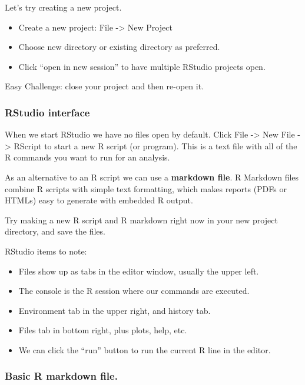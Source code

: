 \documentclass[]{article}
\providecommand{\tightlist}{%
  \setlength{\itemsep}{0pt}\setlength{\parskip}{0pt}}
\begin{document}
Let's try creating a new project.

\begin{itemize}
\tightlist
\item
  Create a new project: File -\textgreater{} New Project
\item
  Choose new directory or existing directory as preferred.
\item
  Click ``open in new session'' to have multiple RStudio projects open.
\end{itemize}

Easy Challenge: close your project and then re-open it.

\subsubsection{RStudio interface}\label{rstudio-interface}

When we start RStudio we have no files open by default. Click File
-\textgreater{} New File -\textgreater{} RScript to start a new R script
(or program). This is a text file with all of the R commands you want to
run for an analysis.

As an alternative to an R script we can use a \textbf{markdown file}. R
Markdown files combine R scripts with simple text formatting, which
makes reports (PDFs or HTMLs) easy to generate with embedded R output.

Try making a new R script and R markdown right now in your new project
directory, and save the files.

RStudio items to note:

\begin{itemize}
\tightlist
\item
  Files show up as tabs in the editor window, usually the upper left.
\item
  The console is the R session where our commands are executed.
\item
  Environment tab in the upper right, and history tab.
\item
  Files tab in bottom right, plus plots, help, etc.
\item
  We can click the ``run'' button to run the current R line in the
  editor.
\end{itemize}

\subsubsection{Basic R markdown file.}\label{basic-r-markdown-file.}
\end{document}
